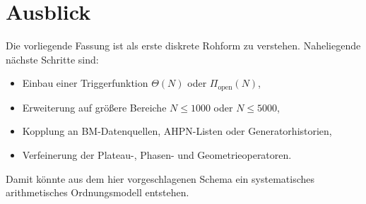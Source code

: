 \documentclass[11pt,a4paper]{article}
\theoremstyle{plain}
\theoremstyle{definition}
\theoremstyle{remark}
\begin{document}
\section{Ausblick}

Die vorliegende Fassung ist als erste diskrete Rohform zu verstehen. 
Naheliegende nächste Schritte sind:
\begin{itemize}
    \item Einbau einer Triggerfunktion \(\Theta(N)\) oder \(\Pi_{\mathrm{open}}(N)\),
    \item Erweiterung auf größere Bereiche \(N\le 1000\) oder \(N\le 5000\),
    \item Kopplung an BM-Datenquellen, AHPN-Listen oder Generatorhistorien,
    \item Verfeinerung der Plateau-, Phasen- und Geometrieoperatoren.
\end{itemize}

Damit könnte aus dem hier vorgeschlagenen Schema ein systematisches arithmetisches Ordnungsmodell entstehen.
\end{document}
